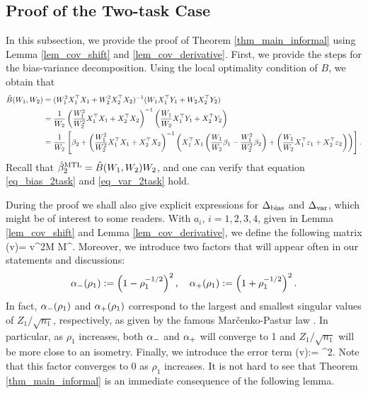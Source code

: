 \subsection{Proof of the Two-task Case}\label{app_proof_main_thm}

In this subsection, we provide the proof of Theorem \ref{thm_main_informal} using Lemma  \ref{lem_cov_shift} and \ref{lem_cov_derivative}.
First, we provide the steps for the bias-variance decomposition.
Using the local optimality condition of $B$, we obtain that
\begin{align*}
	 \hat{B}(W_1, W_2) &= (W_1^2 X_1^{\top}X_1 + W_2^2 X_2^{\top}X_2)^{-1} (W_1 X_1^{\top}Y_1 + W_2 X_2^{\top}Y_2)\\
	&= \frac{1}{W_2} \left( \frac{W_1^2}{W_2^2}  X_1^{\top}X_1 + X_2^{\top}X_2\right)^{-1} \left(\frac{W_1}{W_2} X_1^{\top}Y_1 + X_2^{\top}Y_2\right) \\
	&= \frac{1}{W_2}\left[\beta_2 + \left(\frac{W_1^2}{W_2^2} X_1^{\top}X_1 + X_2^{\top}X_2\right)^{-1}\left({X_1^{\top}X_1\left(\frac{W_1}{W_2}\beta_1 - \frac{W_1^2}{W_2^2} \beta_2\right) + \left(\frac{W_1}{W_2} X_1^{\top}\varepsilon_1 + X_2^{\top}\varepsilon_2\right)}\right)\right].
\end{align*}
Recall that $\hat{\beta}_2^{\textup{MTL}} = \hat{B}(W_1, W_2) W_2$, and one can verify that equation \eqref{eq_bias_2task} and \eqref{eq_var_2task} hold.

During the proof we shall also give explicit expressions for $\Delta_{\text{bias}}$ and $\Delta_{\text{var}}$, which might be of interest to some readers.
With $a_i$, $i=1,2,3,4$, given in Lemma \ref{lem_cov_shift} and Lemma \ref{lem_cov_derivative}, 
we define the following matrix
\be\label{defnpihat}\Pi \equiv \Pi(\hat v)= \cdot \hat v^2{M}  {M}^{\top}.\ee
Moreover, we introduce two factors that will appear often in our statements and discussions:
$$\alpha_-(\rho_1):=\left(1- \rho_1^{-1/2}\right)^2,\quad \alpha_+(\rho_1):=\left(1 + \rho_1^{-1/2}\right)^2.$$ 
In fact, $\alpha_-(\rho_1)$ and $\alpha_+(\rho_1)$ correspond to the largest and smallest singular values of $Z_1/\sqrt{n_1}$, respectively, as given by the famous Mar{\v c}enko-Pastur law \cite{MP}. In particular, as $\rho_1$ increases, both $\alpha_-$ and $\alpha_+$ will converge to 1 and $Z_1/\sqrt{n_1}$ will be more close to an isometry. Finally, we introduce the error term  
\be\label{eq_deltaextra} 
 \delta(\hat v):= \cdot  {}^2.\ee
Note that this factor converges to 0 as $\rho_1$ increases. It is not hard to see that Theorem \ref{thm_main_informal} is an immediate consequence of the following lemma.

